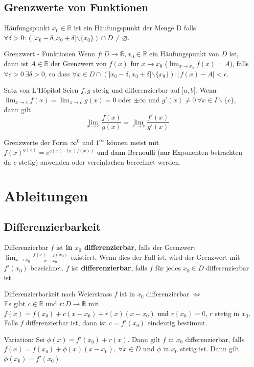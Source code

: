 \documentclass[a4paper,10pt]{article}
\def\R{\mathbb{R}}
\begin{document}
\subsection{Grenzwerte von Funktionen}
\begin{subbox}{Häufungspunkt}
 $x_0 \in \R$ ist ein Häufungspunkt der Menge D falls $\forall \delta > 0: (]x_0 - \delta, x_0 + \delta[ \backslash \{x_0\}) \cap D \ne \varnothing$.
\end{subbox}

\begin{mainbox}{Grenzwert - Funktionen}
 Wenn $f: D \to \R, x_0 \in \R$ ein Häufungspunkt von $D$ ist, dann ist $A \in \R$ der Grenzwert von $f(x)$ für $x \to x_0$ ($\lim_{x\to x_0} f(x) = A$), falls $\forall \epsilon > 0 \ \exists \delta > 0$, so dass $\forall x \in D \cap (]x_0 - \delta, x_0 + \delta[ \backslash \{x_0\}): |f(x) - A| < \epsilon$.
\end{mainbox}

\begin{subbox}{Satz von L'Hôpital}
  Seien $f,g$ stetig und differenzierbar auf $]a,b[$. Wenn $\lim_{x\to c} f(x) = \lim_{x \to c} g(x) = 0$ oder $\pm \infty$ und $g'(x) \ne 0 \ \forall x \in I \backslash \{c\}$, dann gilt $$\lim_{x\to c} \frac{f(x)}{g(x)} = \lim_{x\to c}\frac{f'(x)}{g'(x)}$$
\end{subbox}

Grenzwerte der Form $\infty^0$ und $1^\infty$ können meist mit $f(x)^{g(x)} = e^{g(x)\cdot \ln(f(x))}$ und dann Bernoulli (nur Exponenten betrachten da $e$ stetig) anwenden oder vereinfachen berechnet werden.

\section{Ableitungen}
\subsection{Differenzierbarkeit}
\begin{mainbox}{Differenzierbar}
 $f$ ist \textbf{in $x_0$ differenzierbar}, falls der Grenzwert $\lim_{x\to x_0} \frac{f(x) - f(x_0)}{x - x_0}$ existiert. Wenn dies der Fall ist, wird der Grenzwert mit $f'(x_0)$ bezeichnet. $f$ ist \textbf{differenzierbar}, falls $f$ für jedes $x_0 \in D$ differenzierbar ist.
\end{mainbox}
\begin{subbox}{Differenzierbarkeit nach Weierstrass}
 $f$ ist in $x_0$ differenzierbar $\iff$ \\
 Es gibt $c \in \R$ und $r: D \to \R$ mit $f(x) = f(x_0) + c(x - x_0) + r(x) (x - x_0)$ und $r(x_0) = 0$, $r$ stetig in $x_0$. \\
 Falls $f$ differenzierbar ist, dann ist $c = f'(x_0)$ eindeutig bestimmt.
\end{subbox}
Variation: Sei $\phi(x) = f'(x_0) + r(x)$. Dann gilt $f$ in $x_0$ differenzierbar, falls $f(x) = f(x_0) + \phi(x) (x-x_0), \ \forall x \in D$ und $\phi$ in $x_0$ stetig ist.
Dann gilt $\phi(x_0) = f'(x_0)$.
\end{document}
